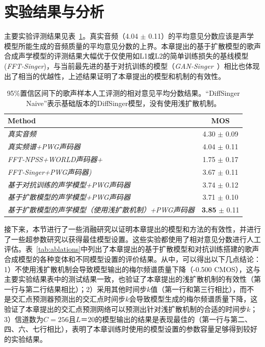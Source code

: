 \section{实验结果与分析}
主要实验评测结果见表~\ref{tab:main_exp}。真实音频（4.04 $\pm$ 0.11）的平均意见分数应该是声学模型所能生成的音频质量的平均意见分数的上界。本章提出的基于扩散模型的歌声合成声学模型的评测结果大幅优于仅使用如L1或L2的简单训练损失的基线模型 (\textit{FFT-Singer})，与当前最先进的基于对抗训练的模型（\textit{GAN-Singer}~\cite{wu2020adversarially}）相比也体现出了相当的优越性，上述结果证明了本章提出的模型和机制的有效性。
\begin{table}[!h]
	\centering
	\setlength{\belowcaptionskip}{8pt} %
	\caption{95\%置信区间下的歌声样本人工评测的相对意见平均分数结果。``DiffSinger Naive''表示基础版本的DiffSinger模型，没有使用浅扩散机制。}
	\begin{tabular}{|l|c|}
		\toprule
		Method &  MOS  \\
		\midrule
		\textit{真实音频} & 4.30 $\pm$ 0.09  \\
	    \textit{真实频谱+PWG声码器} & 4.04 $\pm$ 0.11  \\
		\midrule
		\textit{FFT-NPSS+WORLD声码器+} & 1.75  $\pm$ 0.17  \\
		\textit{FFT-Singer+PWG声码器)} & 3.67 $\pm$ 0.11 \\
		\textit{基于对抗训练的声学模型+PWG声码器} & 3.74 $\pm$ 0.12  \\
		\midrule
		\textit{基于扩散模型的声学模型+PWG声码器} & 3.71 $\pm$ 0.10 \\
		\textit{基于扩散模型的声学模型（使用浅扩散机制）+PWG声码器} & \textbf{3.85} $\pm$ 0.11 \\
		\bottomrule
	\end{tabular}
	\label{tab:main_exp}
\end{table}
接下来，本节进行了一些消融研究以证明本章提出的模型和方法的有效性，并进行了一些超参数研究以获得最佳模型设置。这些实验都使用了相对意见分数进行人工评估。表~\ref{tab:ablations}中列出了本章提出的基于扩散模型和对抗训练搭建的歌声合成模型的各种变体和不同模型设置的评价结果。从中，可以得出以下几点结论：1）不使用浅扩散机制会导致模型输出的梅尔频谱质量下降（-0.500 CMOS），这与主要实验结果表中的测试结果一致，也验证了本章提出的浅扩散机制的有效性（第一行与第二行结果相比）；2）采用其他时间步$k$值（第一行和第三行相比），而不是交汇点预测器预测出的交汇点时间步$k$会导致模型生成的梅尔频谱质量下降，这验证了本章提出的交汇点预测网络可以预测出针对浅扩散机制的合适的时间步$k$；3）信道数为$C=256$且$L＝20$的模型输出的结果是表现最佳的（第一行与第二、四、六、七行相比），表明了本章训练时使用的模型设置的参数容量足够得到较好的实验结果。
